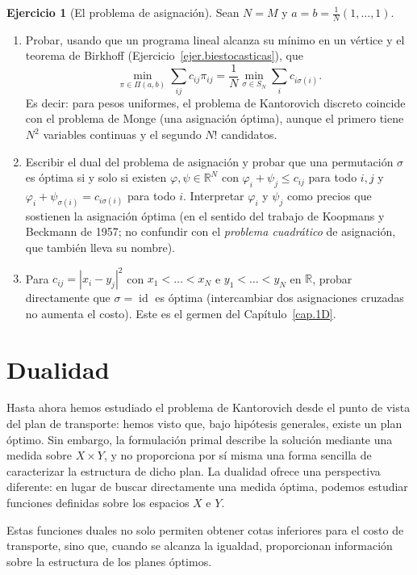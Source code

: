 \documentclass[12pt, a4paper]{amsbook}
\newcommand{\id}{\operatorname{id}}
\newcommand{\R}{{\mathbb R}}
\theoremstyle{remark}
\theoremstyle{definition}
\newtheorem{ejercicio}{Ejercicio}[chapter]
\numberwithin{section}{chapter}
\numberwithin{subsection}{section}
\numberwithin{equation}{section}
\numberwithin{figure}{chapter}
\begin{document}
\begin{ejercicio}[El problema de asignación]\label{ejer.PL.asignacion}
Sean $N=M$ y $a=b=\frac1N(1,\dots,1)$.
\begin{enumerate}[label=(\alph*)]
\item Probar, usando que un programa lineal alcanza su mínimo en un vértice
y el teorema de Birkhoff (Ejercicio~\ref{ejer.biestocasticas}), que
\[
\min_{\pi\in\Pi(a,b)}\sum_{ij}c_{ij}\pi_{ij}
=\frac1N\min_{\sigma\in S_N}\sum_ic_{i\sigma(i)}.
\]
Es decir: para pesos uniformes, el problema de Kantorovich discreto coincide
con el problema de Monge (una asignación óptima), aunque el primero tiene
$N^2$ variables continuas y el segundo $N!$ candidatos.
\item Escribir el dual del problema de asignación y probar que una
permutación $\sigma$ es óptima si y solo si existen $\varphi,\psi\in\R^N$
con $\varphi_i+\psi_j\le c_{ij}$ para todo $i,j$ y
$\varphi_i+\psi_{\sigma(i)}=c_{i\sigma(i)}$ para todo $i$. Interpretar
$\varphi_i$ y $\psi_j$ como precios que sostienen la asignación óptima (en
el sentido del trabajo de Koopmans y Beckmann de 1957; no confundir con el
\emph{problema cuadrático} de asignación, que también lleva su nombre).
\item Para $c_{ij}=|x_i-y_j|^2$ con $x_1<\dots<x_N$ e $y_1<\dots<y_N$ en
$\R$, probar directamente que $\sigma=\id$ es óptima (intercambiar dos
asignaciones cruzadas no aumenta el costo). Este es el germen del
Capítulo~\ref{cap.1D}.
\end{enumerate}
\end{ejercicio}

\chapter{Dualidad}\label{cap.dualidad}

Hasta ahora hemos estudiado el problema de Kantorovich desde el punto de vista del plan de transporte: hemos visto que, bajo hipótesis generales, existe un plan óptimo. Sin embargo, la formulación primal describe la solución mediante una medida sobre $X\times Y$, y no proporciona por sí misma una forma sencilla de caracterizar la estructura de dicho plan. La dualidad ofrece una perspectiva diferente: en lugar de buscar directamente una medida óptima, podemos estudiar funciones definidas sobre los espacios $X$ e $Y$.

Estas funciones duales no solo permiten obtener cotas inferiores para el costo de transporte, sino que, cuando se alcanza la igualdad, proporcionan información sobre la estructura de los planes óptimos.
\end{document}
